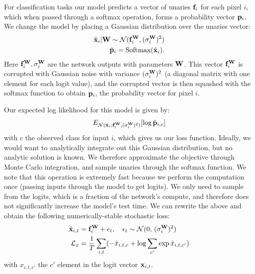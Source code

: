 For classification tasks our model predicts a vector of unaries $\mathbf{f}_i$ for each pixel $i$, which when passed through a softmax operation, forms a probability vector $\mathbf{p}_i$. We change the model by placing a Gaussian distribution over the unaries vector:
\begin{equation}
\begin{split}
\hat{\mathbf{x}}_i | \mathbf{W} \sim \mathcal{N}(\mathbf{f}^{\mathbf{W}}_i, (\sigma_i^{\mathbf{W}})^2)
\\
\hat{\mathbf{p}}_i = \text{Softmax}(\hat{\mathbf{x}}_i).
\end{split}
\end{equation}
Here $\mathbf{f}^{\mathbf{W}}_i, \sigma_i^{\mathbf{W}}$ are the network outputs with parameters $\mathbf{W}$.
This vector $\mathbf{f}^{\mathbf{W}}_i$ is corrupted with Gaussian noise with variance $(\sigma_i^{\mathbf{W}})^2$ (a diagonal matrix with one element for each logit value), and the corrupted vector is then squashed with the softmax function to obtain $\mathbf{p}_i$, the probability vector for pixel $i$.

Our expected log likelihood for this model is given by:
\begin{equation}
E_{\mathcal{N}(\hat{\mathbf{x}}_i; \mathbf{f}^{\mathbf{W}}_i, (\sigma_i^{\mathbf{W}})^2)}[\log \hat{\mathbf{p}}_{i,c}]
\end{equation}
with $c$ the observed class for input $i$,
which gives us our loss function.
Ideally, we would want to analytically integrate out this Gaussian distribution, but no analytic solution is known.
We therefore approximate the objective through Monte Carlo integration, and sample unaries through the softmax function.
We note that this operation is extremely fast because we perform the computation once (passing inputs through the model to get logits). We only need to sample from the logits, which is a fraction of the network's compute, and therefore does not significantly increase the model's test time. 
We can rewrite the above and obtain the following numerically-stable stochastic loss:
\begin{equation}
\begin{split}
\hat{\mathbf{x}}_{i,t} &= \mathbf{f}^{\mathbf{W}}_i + \epsilon_t, \quad \epsilon_t \sim \mathcal{N}(0,\,(\sigma_i^{\mathbf{W}})^2)
\\
\mathcal{L}_x &= \frac{1}{T} \sum_{i,t} (- \hat{x}_{i,t,c} + \log \sum_{c'} \exp \hat{x}_{i,t,c'})
\end{split}
\label{eqn:aleatoric_classification_loss}
\end{equation}
with $x_{i,t,c'}$ the $c'$ element in the logit vector $\mathbf{x}_{i,t}$. 

